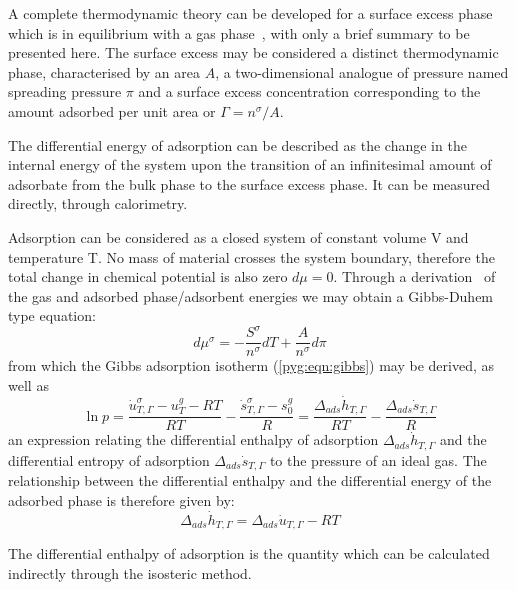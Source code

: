 A complete thermodynamic theory can be developed for a surface 
excess phase which is in equilibrium with a gas 
phase~\cite{rouquerolAdsorptionPowdersPorous2013}, with only
a brief summary to be presented here.
The surface excess may be considered a distinct thermodynamic phase, 
characterised by an area \(A\), a two-dimensional analogue of 
pressure named spreading pressure \(\pi\) and a surface excess 
concentration corresponding to the amount adsorbed per unit
area or \(\Gamma = n^{\sigma}/A\).

The differential energy of adsorption can be described as the 
change in the internal energy of the system upon the transition
of an infinitesimal amount of adsorbate from the bulk phase
to the surface excess phase. It can be measured directly, through
calorimetry.

Adsorption can be considered as a closed system of constant volume
V and temperature T. No mass of material crosses the system boundary,
therefore the total change in chemical potential is also
zero \(d\mu = 0\). Through
a derivation~\cite{rouquerolAdsorptionPowdersPorous2013} of the
gas and adsorbed phase/adsorbent energies we may obtain a
Gibbs-Duhem type equation:
%
\begin{equation}
	d \mu^{\sigma} = - \frac{S^{\sigma}}{n^{\sigma}} dT + \frac{A}{n^{\sigma}} d \pi
\end{equation}
%
from which the Gibbs adsorption isotherm (\autoref{pyg:eqn:gibbs}) may
be derived, as well as
%
\begin{equation}\label{calo:eqn:enthalpy}
	\ln p = \frac{\dot{u}_{T, \Gamma}^{\sigma} - u_T^g - RT}{RT} %
	- \frac{\dot{s}_{T, \Gamma}^{\sigma} - s^{g}_{0}}{R} %
	= \frac{\Delta_{ads} \dot{h}_{T, \Gamma}}{RT} - \frac{\Delta_{ads} \dot{s}_{T, \Gamma}}{R}
\end{equation}
%
an expression relating the differential enthalpy of adsorption
\(\Delta_{ads} \dot{h}_{T, \Gamma}\) and
the differential entropy of adsorption \(\Delta_{ads} \dot{s}_{T, \Gamma}\)
to the pressure of an ideal gas.
The relationship between the differential enthalpy and the differential energy
of the adsorbed phase is therefore given by:
%
\begin{equation}\label{calo:eqn:adj}
	\Delta_{ads} \dot{h}_{T, \Gamma} = \Delta_{ads} \dot{u}_{T, \Gamma} - RT
\end{equation}

The differential enthalpy of adsorption is the quantity which
can be calculated indirectly through the isosteric method.

